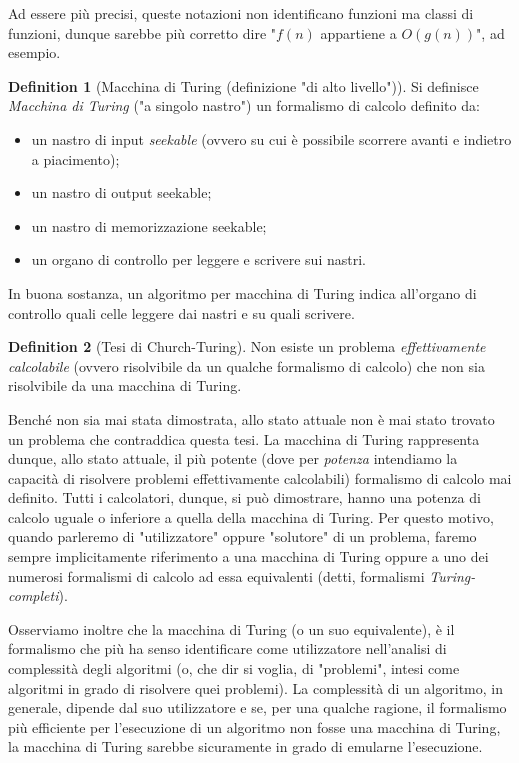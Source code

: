 \documentclass[12pt, a4paper]{report}
\theoremstyle{definition}
\newtheorem{definition}{Definition}[section]
\begin{document}
				Ad essere più precisi, queste notazioni non identificano funzioni ma classi di funzioni, dunque sarebbe più corretto dire "$f(n)$ appartiene a $O(g(n))$", ad esempio.
				\begin{definition}[Macchina di Turing (definizione "di alto livello")]
					Si definisce \emph{Macchina di Turing} ("a singolo nastro") un formalismo di calcolo definito da:
					\begin{itemize}
						\item un nastro di input \emph{seekable} (ovvero su cui è possibile scorrere avanti e indietro a piacimento);
						\item un nastro di output seekable;
						\item un nastro di memorizzazione seekable;
						\item un organo di controllo per leggere e scrivere sui nastri.
					\end{itemize}
				\end{definition}
				In buona sostanza, un algoritmo per macchina di Turing indica all'organo di controllo quali celle leggere dai nastri e su quali scrivere.
				\begin{definition}[Tesi di Church-Turing]
					Non esiste un problema \emph{effettivamente calcolabile} (ovvero risolvibile da un qualche formalismo di calcolo) che non sia risolvibile da una macchina di Turing.
				\end{definition}
				Benché non sia mai stata dimostrata, allo stato attuale non è mai stato trovato un problema che contraddica questa tesi. La macchina di Turing rappresenta dunque, allo stato attuale, il più potente (dove per \emph{potenza} intendiamo la capacità di risolvere problemi effettivamente calcolabili) formalismo di calcolo mai definito. Tutti i calcolatori, dunque, si può dimostrare, hanno una potenza di calcolo uguale o inferiore a quella della macchina di Turing. Per questo motivo, quando parleremo di "utilizzatore" oppure "solutore" di un problema, faremo sempre implicitamente riferimento a una macchina di Turing oppure a uno dei numerosi formalismi di calcolo ad essa equivalenti (detti, formalismi \emph{Turing-completi}). 
				
				Osserviamo inoltre che la macchina di Turing (o un suo equivalente), è il formalismo che più ha senso identificare come utilizzatore nell'analisi di complessità degli algoritmi (o, che dir si voglia, di "problemi", intesi come algoritmi in grado di risolvere quei problemi). La complessità di un algoritmo, in generale, dipende dal suo utilizzatore e se, per una qualche ragione, il formalismo più efficiente per l'esecuzione di un algoritmo non fosse una macchina di Turing, la macchina di Turing sarebbe sicuramente in grado di emularne l'esecuzione.
\end{document}
